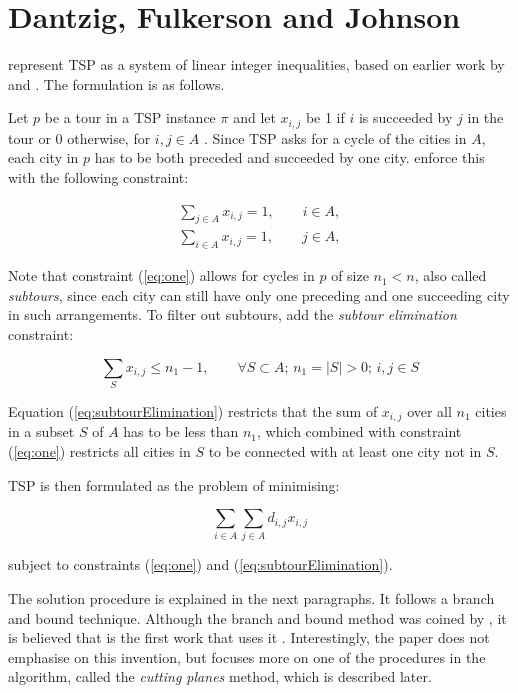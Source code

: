\documentclass[a4paper,12pt]{article}
\begin{document}
\section{Dantzig, Fulkerson and Johnson}
\label{sec:dantzig54}
\citet{Dantzig54} represent TSP as a system of linear integer inequalities, based on earlier work by \citet{heller53} and \citet{kuhn55}. The formulation is as follows.

Let $p$ be a tour in a TSP instance $\pi$ and let $x_{i,j}$ be 1 if $i$ is succeeded by $j$ in the tour or 0 otherwise, for $i,j \in A$ . Since TSP asks for a cycle of the cities in $A$, each city in $p$ has to be both preceded and succeeded by one city. \citet{Dantzig54} enforce this with the following constraint:

\begin{equation}
\label{eq:one}
\begin{split}
  \sum_{j \in A} x_{i,j} = 1, \qquad i \in A,\\
  \sum_{i \in A} x_{i,j} = 1, \qquad j \in A,
\end{split}
\end{equation}

Note that constraint (\ref{eq:one}) allows for cycles in $p$ of size $n_{1} < n$, also called \textit{subtours}, since each city can still have only one preceding and one succeeding city in such arrangements. To filter out subtours, \citet{Dantzig54} add the \textit{subtour elimination} constraint:

\begin{equation}
\label{eq:subtourElimination}
\sum_{S} x_{i,j} \leq n_{1} - 1, \qquad \forall S \subset A; \, n_{1} = |S| > 0; \, i,j \in S
\end{equation}

Equation (\ref{eq:subtourElimination}) restricts that the sum of $x_{i,j}$ over all $n_{1}$ cities in a subset $S$ of $A$ has to be less than $n_{1}$, which combined with constraint (\ref{eq:one}) restricts all cities in $S$ to be connected with at least one city not in $S$.

TSP is then formulated as the problem of minimising:

\begin{equation}
\label{eq:objfunc}
\sum_{i\in A}\sum_{j\in A} d_{i,j}x_{i,j}
\end{equation}

subject to constraints (\ref{eq:one}) and (\ref{eq:subtourElimination}).

The solution procedure is explained in the next paragraphs. It follows a branch and bound technique. Although the branch and bound method was coined by \citet{Little63}, it is believed that \citet{Dantzig54} is the first work that uses it \citep{tspbible}. Interestingly, the paper does not emphasise on this invention, but focuses more on one of the procedures in the algorithm, called the \textit{cutting planes} method, which is described later.
\end{document}
